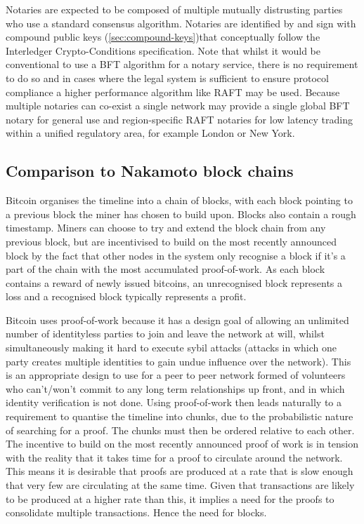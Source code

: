\documentclass{article}
\begin{document}
Notaries are expected to be composed of multiple mutually distrusting parties who use a standard consensus algorithm.
Notaries are identified by and sign with compound public keys (\cref{sec:compound-keys})that conceptually follow the
Interledger Crypto-Conditions specification\cite{ILPCC}. Note that whilst it would be conventional to use a BFT
algorithm for a notary service, there is no requirement to do so and in cases where the legal system is sufficient to
ensure protocol compliance a higher performance algorithm like RAFT may be used. Because multiple notaries can co-exist
a single network may provide a single global BFT notary for general use and region-specific RAFT notaries for low
latency trading within a unified regulatory area, for example London or New York.

\subsection{Comparison to Nakamoto block chains}

Bitcoin organises the timeline into a chain of blocks, with each block pointing to a previous block the miner has chosen
to build upon. Blocks also contain a rough timestamp. Miners can choose to try and extend the block chain from any
previous block, but are incentivised to build on the most recently announced block by the fact that other nodes in the
system only recognise a block if it's a part of the chain with the most accumulated proof-of-work. As each block contains
a reward of newly issued bitcoins, an unrecognised block represents a loss and a recognised block typically represents
a profit.

Bitcoin uses proof-of-work because it has a design goal of allowing an unlimited number of identityless parties to join
and leave the network at will, whilst simultaneously making it hard to execute sybil attacks (attacks in which one party
creates multiple identities to gain undue influence over the network). This is an appropriate design to use for a peer to
peer network formed of volunteers who can't/won't commit to any long term relationships up front, and in which identity
verification is not done. Using proof-of-work then leads naturally to a requirement to quantise the timeline into chunks,
due to the probabilistic nature of searching for a proof. The chunks must then be ordered relative to each other.
The incentive to build on the most recently announced proof of work is in tension with the reality that it takes
time for a proof to circulate around the network. This means it is desirable that proofs are produced at a rate
that is slow enough that very few are circulating at the same time. Given that transactions are likely to be
produced at a higher rate than this, it implies a need for the proofs to consolidate multiple transactions.
Hence the need for blocks.
\end{document}
